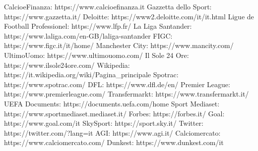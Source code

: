 \documentclass[
    corpo=12pt,
    oneside,
    evenboxes,
    tipotesi=triennale,
    stile=classica,
    oldstyle,
    autoretitolo,
    greek,
]{toptesi}
\begin{document}
\begin{interlinea}{1.5}
\begin{thebibliography}{9}
    CalcioeFinanza: https://www.calcioefinanza.it
    Gazzetta dello Sport: https://www.gazzetta.it/
    Deloitte: https://www2.deloitte.com/it/it.html
    Ligue de Football Professionel: https://www.lfp.fr/
    La Liga Santander: https://www.laliga.com/en-GB/laliga-santander
    FIGC: https://www.figc.it/it/home/
    Manchester City: https://www.mancity.com/
    UltimoUomo: https://www.ultimouomo.com/
    Il Sole 24 Ore: https://www.ilsole24ore.com/
    Wikipedia: https://it.wikipedia.org/wiki/Pagina\_principale
    Spotrac: https://www.spotrac.com/
    DFL: https://www.dfl.de/en/
    Premier League: https://www.premierleague.com/
    Transfermarkt: https://www.transfermarkt.it/
    UEFA Documents: https://documents.uefa.com/home
    Sport Mediaset: https://www.sportmediaset.mediaset.it/
    Forbes: https://forbes.it/
    Goal: https://www.goal.com/it
    SkySport: https://sport.sky.it/
    Twitter: https://twitter.com/?lang=it
    AGI: https://www.agi.it/
    Calciomercato: https://www.calciomercato.com/
    Dunkest: https://www.dunkest.com/it
\end{thebibliography}    
\end{interlinea}
\end{document}
